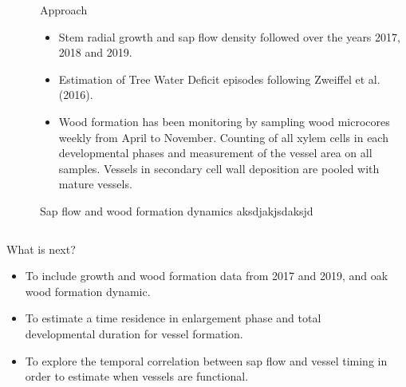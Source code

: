 \documentclass[final]{beamer}
\newlength{\sepwidth}
\newlength{\colwidth}
\newcommand{\separatorcolumn}{\begin{column}{\sepwidth}\end{column}}
\begin{document}
\begin{frame}[t]
\begin{columns}[t]
\begin{column}{\colwidth}
\end{column}

\separatorcolumn


\begin{column}{\colwidth}

    \begin{block}{Approach}
        \begin{itemize}
            \item Stem radial growth and sap flow density followed over the years 2017, 2018 and 2019. 
            \item Estimation of Tree Water Deficit episodes following Zweiffel et al. (2016).
            \item Wood formation has been monitoring by sampling wood microcores weekly from April to November.
Counting of all xylem cells in each developmental phases and measurement of the vessel area on all samples. 
                Vessels in secondary cell wall deposition are pooled with mature vessels.
        \end{itemize}
    \end{block}

    \begin{block}{Sap flow and wood formation dynamics}
        aksdjakjsdaksjd
    \end{block}

	\end{column}

\end{columns}

\begin{columns}[c]
    \begin{column}{.96\paperwidth}

    \begin{block}{What is next?}
        \raggedleft
        \begin{itemize}
            \item To include growth and wood formation data from 2017 and 2019, and oak wood formation dynamic.
            \item To estimate a time residence in enlargement phase and total developmental duration for vessel formation.
            \item To explore the temporal correlation between sap flow and vessel timing in order to estimate when vessels are functional.
        \end{itemize}
    \end{block}
\end{column}

\separatorcolumn

\end{columns}
\end{frame}
\end{document}
